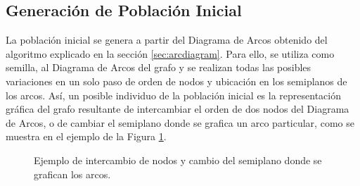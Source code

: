 	\subsection{Generación de Población Inicial}
	\label{subsec:generar_poblacion_inicial}
	La población inicial se genera a partir del Diagrama de Arcos obtenido del algoritmo explicado en la sección \ref{sec:arcdiagram}. 
	Para ello, se utiliza como semilla, al Diagrama de Arcos del  grafo  y  se realizan todas las posibles variaciones en un solo paso de orden de nodos y ubicación en los semiplanos de los arcos. Así, un posible individuo de la población inicial es la representación gráfica del grafo resultante de intercambiar el orden de dos nodos del Diagrama de Arcos, o de cambiar el semiplano donde se grafica  un arco particular, como se muestra en el ejemplo de la Figura \ref{fig:ejemplo_mutacion}.
	
	\begin{figure}[h]
		\centering
		\caption{Ejemplo de intercambio de nodos y cambio del semiplano donde se grafican los arcos.}
		\label{fig:ejemplo_mutacion}
	\end{figure}
	
